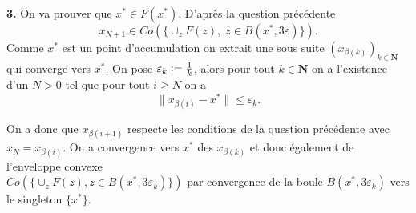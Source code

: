 \documentclass[12pt]{article}
\newcommand{\defeq}{\vcentcolon=}
\newcommand{\N}{\mathbf{N}}
\begin{document}
\bigskip

\textbf{3.}  On va prouver que $x^{*} \in F(x^{*})$. D'après la question précédente \[
x_{N+1} \in Co(\{\cup_{z}F(z), \; z \in B(x^{*}, 3\varepsilon)\})
.\] Comme $x^{*}$ est un point d'accumulation on extrait une sous suite $(x_{\beta(k)})_{k\in \N}$ qui converge vers $x^{*}$. On pose $\varepsilon_{k} \defeq \frac{1}{k}$, alors pour tout $k \in \N$ on a l'existence d'un $N > 0$ tel que pour tout $i \ge N$ on a \[
        \|x_{\beta(i)}- x^{*}\| \le \varepsilon_{k}
.\] 

On a donc que $x_{\beta(i+1)}$ respecte les conditions de la question précédente avec $x_{N} = x_{\beta(i)}$. On a convergence vers $x^{*}$ des $x_{\beta(k)}$ et donc également de l'enveloppe convexe \\
$Co(\{\cup_{z}F(z), z \in B(x^{*}, 3\varepsilon_{k})\})$ par convergence de la boule $B(x^{*}, 3\varepsilon_{k})$ vers le singleton $\{x^{*}\} $.
\end{document}
